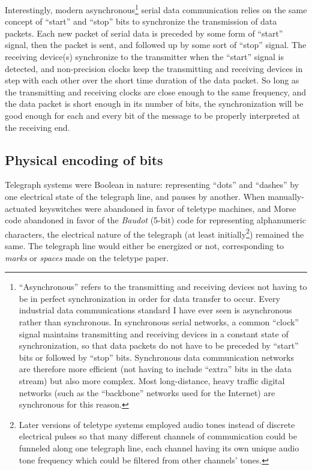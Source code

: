 Interestingly, modern asynchronous\footnote{``Asynchronous'' refers to the transmitting and receiving devices not having to be in perfect synchronization in order for data transfer to occur.  Every industrial data communications standard I have ever seen is asynchronous rather than synchronous.  In synchronous serial networks, a common ``clock'' signal maintains transmitting and receiving devices in a constant state of synchronization, so that data packets do not have to be preceded by ``start'' bits or followed by ``stop'' bits.  Synchronous data communication networks are therefore more efficient (not having to include ``extra'' bits in the data stream) but also more complex.  Most long-distance, heavy traffic digital networks (such as the ``backbone'' networks used for the Internet) are synchronous for this reason.} serial data communication relies on the same concept of ``start'' and ``stop'' bits to synchronize the transmission of data packets.  Each new packet of serial data is preceded by some form of ``start'' signal, then the packet is sent, and followed up by some sort of ``stop'' signal.  The receiving device(s) synchronize to the transmitter when the ``start'' signal is detected, and non-precision clocks keep the transmitting and receiving devices in step with each other over the short time duration of the data packet.  So long as the transmitting and receiving clocks are close enough to the same frequency, and the data packet is short enough in its number of bits, the synchronization will be good enough for each and every bit of the message to be properly interpreted at the receiving end.    







\filbreak
\subsection{Physical encoding of bits}

Telegraph systems were Boolean in nature: representing ``dots'' and ``dashes'' by one electrical state of the telegraph line, and pauses by another.  When manually-actuated keyswitches were abandoned in favor of teletype machines, and Morse code abandoned in favor of the \textit{Baudot} (5-bit) code for representing alphanumeric characters, the electrical nature of the telegraph (at least initially\footnote{Later versions of teletype systems employed audio tones instead of discrete electrical pulses so that many different channels of communication could be funneled along one telegraph line, each channel having its own unique audio tone frequency which could be filtered from other channels' tones.}) remained the same.  The telegraph line would either be energized or not, corresponding to \textit{marks} or \textit{spaces} made on the teletype paper.      

